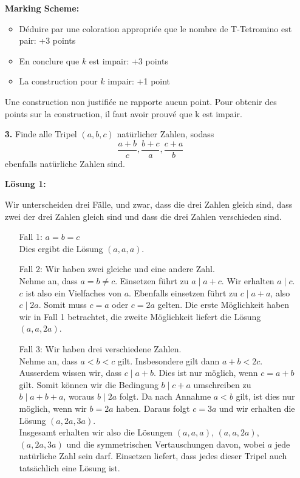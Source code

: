 \documentclass[language=german,style=solution]{smo}
\begin{document}
\begin{enumerate}
\textbf{Marking Scheme:}

\begin{itemize}
\item Déduire par une coloration appropriée que le nombre de T-Tetromino est pair: +3 points
\item En conclure que $k$ est impair: +3 points
\item La construction pour $k$ impair: +1 point
\end{itemize}

Une construction non justifiée ne rapporte aucun point. Pour obtenir des points sur la construction, il faut avoir prouvé que k est impair.

\newpage

\item[\textbf{3.}]
Finde alle Tripel $(a,b,c)$ natürlicher Zahlen, sodass
\[
\frac{a+b}{c},\frac{b+c}{a},\frac{c+a}{b}
\]
ebenfalls natürliche Zahlen sind.

\textbf{Lösung 1:}

Wir unterscheiden drei Fälle, und zwar, dass die drei Zahlen gleich sind, dass zwei der drei Zahlen gleich sind und dass die drei Zahlen verschieden sind.

\begin{minipage}{0.02\textwidth}
\mbox{}
\end{minipage}
\begin{minipage}{0.93\textwidth}
\begin{enumerate}
\item[Fall 1:] $a=b=c$\\
Dies ergibt die Lösung $(a,a,a)$.
\item[Fall 2:] Wir haben zwei gleiche und eine andere Zahl.\\
Nehme an, dass $a=b\neq c$. Einsetzen führt zu $a\mid a+c$. Wir erhalten $a \mid c$. $c$ ist also ein Vielfaches von $a$. Ebenfalls einsetzen führt zu $c \mid a+a$, also $c \mid 2a$. Somit muss $c=a$ oder $c=2a$ gelten. Die erste Möglichkeit haben wir in Fall 1 betrachtet, die zweite Möglichkeit liefert die Lösung $(a,a,2a)$.
\item[Fall 3:] Wir haben drei verschiedene Zahlen.\\
Nehme an, dass $a < b < c$ gilt. Insbesondere gilt dann $a+b<2c$. Ausserdem wissen wir, dass $c\mid a+b$. Dies ist nur möglich, wenn $c=a+b$ gilt. Somit können wir die Bedingung $b\mid c+a$ umschreiben zu $b\mid a+b+a$, woraus $b\mid 2a$ folgt. Da nach Annahme $a<b$ gilt, ist dies nur möglich, wenn wir $b=2a$ haben. Daraus folgt $c=3a$ und wir erhalten die Lösung $(a,2a,3a)$.\\
Insgesamt erhalten wir also die Lösungen $(a,a,a)$, $(a,a,2a)$, $(a,2a,3a)$ und die symmetrischen Vertauschungen davon, wobei $a$ jede natürliche Zahl sein darf. Einsetzen liefert, dass jedes dieser Tripel auch tatsächlich eine Lösung ist.
\end{enumerate}
\end{minipage}


\end{enumerate}
\end{document}
